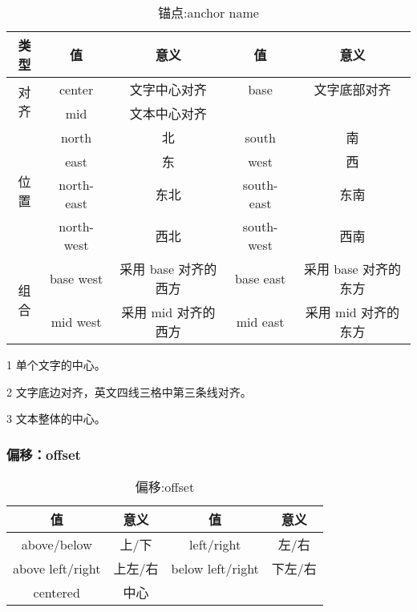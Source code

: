 \begin{table}[H]
    \centering
    \caption{锚点:anchor name}
    \label{table:锚点:anchor name}
    \setlength{\tabcolsep}{3.8mm}
    \begin{threeparttable}
        \begin{tabular}{c|cc|cc}
            \toprule
            \textbf{类型} & \textbf{值} & \textbf{意义} & \textbf{值} & \textbf{意义}\\
            \midrule
            \multirow{2}{*}{对齐}   & center & 文字中心对齐\tnote{1} & base & 文字底部对齐\tnote{2} \\
                                    & mid & 文本中心对齐\tnote{3} &  &  \\
            \midrule
            \multirow{4}{*}{位置}   & north & 北 & south & 南 \\
                                    & east & 东 & west & 西 \\
                                    & north-east & 东北 & south-east & 东南 \\
                                    & north-west & 西北 & south-west & 西南 \\
            \midrule
            \multirow{2}{*}{组合}   & base west & 采用 base 对齐的西方 & base east & 采用 base 对齐的东方\\
                                    & mid west & 采用 mid 对齐的西方 & mid east & 采用 mid 对齐的东方\\
            \bottomrule
        \end{tabular}
        \begin{tablenotes}
            \footnotesize
            \item[1] 单个文字的中心。
            \item[2] 文字底边对齐，英文四线三格中第三条线对齐。
            \item[3] 文本整体的中心。
        \end{tablenotes}
    \end{threeparttable}
\end{table}

\subsubsection{偏移：offset}

\begin{table}[H]
    \centering
    \caption{偏移:offset}
    \label{table:偏移:offset}
    \setlength{\tabcolsep}{9mm}
    \begin{threeparttable}
        \begin{tabular}{c|cc|c}
            \toprule
            \textbf{值} & \textbf{意义} & \textbf{值} & \textbf{意义}\\
            \midrule
            above/below & 上/下 & left/right & 左/右 \\
            above left/right & 上左/右 & below left/right & 下左/右  \\
            centered & 中心 & & \\
            \bottomrule
        \end{tabular}
    \end{threeparttable}
\end{table}